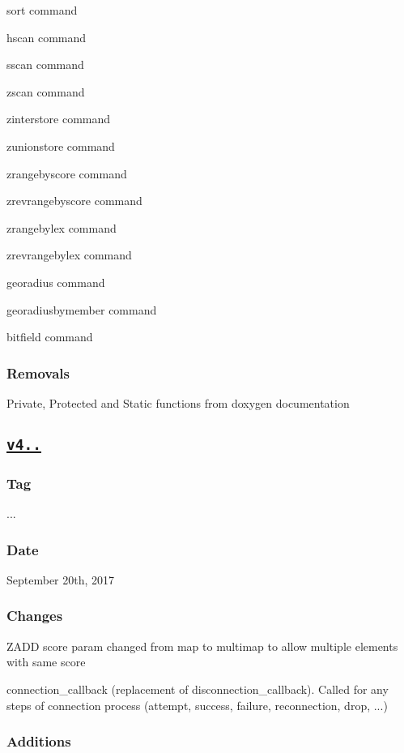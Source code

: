 \begin{DoxyItemize}
\item sort command
\item hscan command
\item sscan command
\item zscan command
\item zinterstore command
\item zunionstore command
\item zrangebyscore command
\item zrevrangebyscore command
\item zrangebylex command
\item zrevrangebylex command
\item georadius command
\item georadiusbymember command
\item bitfield command \subsubsection*{Removals}
\end{DoxyItemize}


\begin{DoxyItemize}
\item Private, Protected and Static functions from doxygen documentation
\end{DoxyItemize}

\subsection*{\href{https://github.com/Cylix/cpp_redis/releases/tag/4.0.0}{\tt v4..}}

\subsubsection*{Tag}

{..}. \subsubsection*{Date}

September 20th, 2017 \subsubsection*{Changes}


\begin{DoxyItemize}
\item Z\+A\+DD score param changed from map to multimap to allow multiple elements with same score
\item connection\+\_\+callback (replacement of disconnection\+\_\+callback). Called for any steps of connection process (attempt, success, failure, reconnection, drop, ...) \subsubsection*{Additions}
\end{DoxyItemize}



